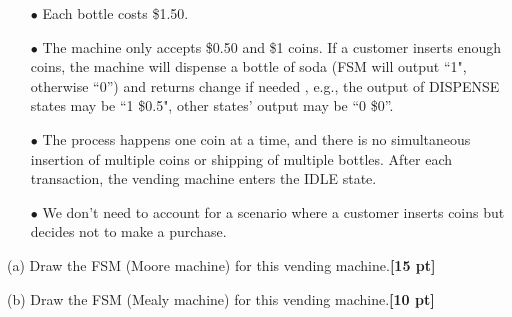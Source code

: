 \documentclass[a4paper]{article}
\begin{document}
\begin{itemize}
\item[$\bullet$] Each bottle costs \$1.50. 
\item[$\bullet$] The machine only accepts \$0.50 and \$1 coins. If a customer inserts enough coins, the machine will dispense a bottle of soda (FSM will output ``1", otherwise ``0'') and returns change if needed , e.g., the output of DISPENSE states may be ``1 \$0.5", other states' output may be ``0 \$0''.
\item[$\bullet$] The process happens one coin at a time, and there is no simultaneous insertion of multiple coins or shipping of multiple bottles. After each transaction, the vending machine enters the IDLE state.
\item[$\bullet$] We don’t need to account for a scenario where a customer inserts coins but decides not to make a purchase.
\end{itemize}


(a) Draw the FSM (Moore machine) for this vending machine.\textbf{[15 pt]}

(b) Draw the FSM (Mealy machine) for this vending machine.\textbf{[10 pt]}
\end{document}
